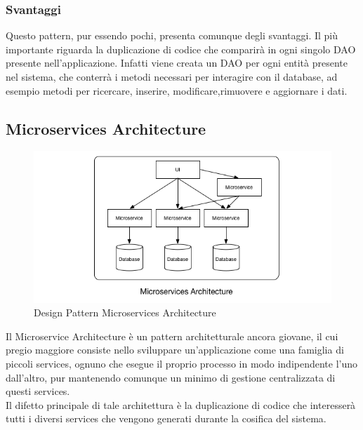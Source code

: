 \documentclass[a4paper, titlepage]{article}
\begin{document}
\subsubsection{Svantaggi}
Questo pattern, pur essendo pochi, presenta comunque degli svantaggi. Il più importante riguarda la duplicazione di codice che comparirà in ogni singolo DAO presente nell'applicazione. Infatti viene creata un DAO per ogni entità presente nel sistema, che conterrà i metodi necessari per interagire con il database, ad esempio metodi per ricercare, inserire, modificare,rimuovere e aggiornare i dati.

\subsection{Microservices Architecture}
\begin{figure}[htp]
\centering
\includegraphics[scale=0.75]{Img/microservice.png}
\caption{Design Pattern Microservices Architecture}
\label{}
\end{figure}
Il Microservice Architecture è un pattern architetturale ancora giovane, il cui pregio maggiore consiste nello sviluppare un'applicazione come una famiglia di piccoli services, ognuno che esegue il proprio processo in modo indipendente l'uno dall'altro, pur mantenendo comunque un minimo di gestione centralizzata di questi services.
\\ Il difetto principale di tale architettura è la duplicazione di codice che interesserà tutti i diversi services che vengono generati durante la cosifica del sistema.
\end{document}
